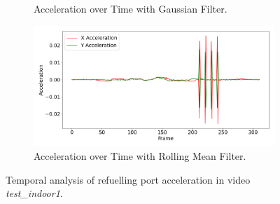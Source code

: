 \documentclass[12pt,oneside]{book} %
\begin{document}
\begin{figure}[H]
\begin{subfigure}[t]{0.65\textwidth}
        \caption{Acceleration over Time with Gaussian Filter.}
        \label{fig:acceleration-test-indoor1-gaussian}
    \end{subfigure}
    \hfill
    \begin{subfigure}[t]{0.65\textwidth}
        \includegraphics[width=\textwidth]{figures/bbox_metrics/test_indoor1 (Rolling Mean Filter)_acceleration.png}
        \caption{Acceleration over Time with Rolling Mean Filter.}
        \label{fig:acceleration-test-indoor1-rolling}
    \end{subfigure}
    \caption{Temporal analysis of refuelling port acceleration in video \textit{test\_indoor1}.}
    \label{fig:acceleration-test-indoor1}
\end{figure}
\end{document}
